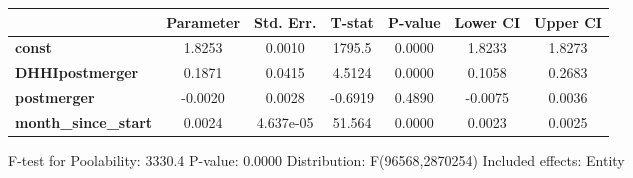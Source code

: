 \documentclass{report}
\begin{document}
\begin{center}
\begin{tabular}{lcccccc}
                             & \textbf{Parameter} & \textbf{Std. Err.} & \textbf{T-stat} & \textbf{P-value} & \textbf{Lower CI} & \textbf{Upper CI}  \\
\midrule
\textbf{const}               &       1.8253       &       0.0010       &      1795.5     &      0.0000      &       1.8233      &       1.8273       \\
\textbf{DHHIpostmerger}      &       0.1871       &       0.0415       &      4.5124     &      0.0000      &       0.1058      &       0.2683       \\
\textbf{postmerger}          &      -0.0020       &       0.0028       &     -0.6919     &      0.4890      &      -0.0075      &       0.0036       \\
\textbf{month\_since\_start} &       0.0024       &     4.637e-05      &      51.564     &      0.0000      &       0.0023      &       0.0025       \\
\bottomrule
\end{tabular}
\end{center}

F-test for Poolability: 3330.4 \newline
 P-value: 0.0000 \newline
 Distribution: F(96568,2870254) \newline
  \newline
 Included effects: Entity
\end{document}
